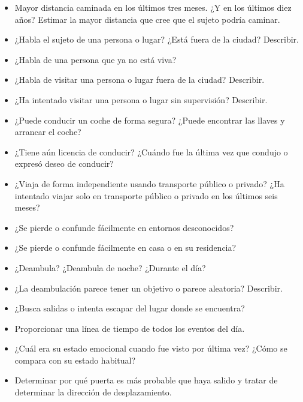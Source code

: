 \begin{itemize}
    \item Mayor distancia caminada en los últimos tres meses. ¿Y en los últimos diez años? Estimar la mayor distancia que cree que el sujeto podría caminar.
    \item ¿Habla el sujeto de una persona o lugar? ¿Está fuera de la ciudad? Describir.
    \item ¿Habla de una persona que ya no está viva? 
    \item ¿Habla de visitar una persona o lugar fuera de la ciudad? Describir.
    \item ¿Ha intentado visitar una persona o lugar sin supervisión? Describir.
    \item ¿Puede conducir un coche de forma segura? ¿Puede encontrar las llaves y arrancar el coche?
    \item ¿Tiene aún licencia de conducir? ¿Cuándo fue la última vez que condujo o expresó deseo de conducir?
    \item ¿Viaja de forma independiente usando transporte público o privado? ¿Ha intentado viajar solo en transporte público o privado en los últimos seis meses?
    \item ¿Se pierde o confunde fácilmente en entornos desconocidos?
    \item ¿Se pierde o confunde fácilmente en casa o en su residencia?
    \item ¿Deambula? ¿Deambula de noche? ¿Durante el día?
    \item ¿La deambulación parece tener un objetivo o parece aleatoria? Describir.
    \item ¿Busca salidas o intenta escapar del lugar donde se encuentra?
    \item Proporcionar una línea de tiempo de todos los eventos del día.
    \item ¿Cuál era su estado emocional cuando fue visto por última vez? ¿Cómo se compara con su estado habitual?
    \item Determinar por qué puerta es más probable que haya salido y tratar de determinar la dirección de desplazamiento.
\end{itemize}


